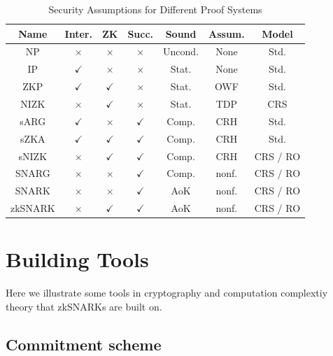 \documentclass[acmtog]{acmart}
\begin{document}
\begin{table}[tb]
	\caption{Security Assumptions for Different Proof Systems}
	\label{tab:security.assumption}
	\centering

	\begin{tabular}{ccccccc}
	\hline

	\hline
	\textbf{Name} & \textbf{Inter.} & \textbf{ZK} & \textbf{Succ.} & \textbf{Sound} & \textbf{Assum.} & \textbf{Model} \\
	\hline
		NP          & $\times$     & $\times$     & $\times$     & Uncond. & None       & Std. \\
		IP          & $\checkmark$ & $\times$     & $\times$     & Stat.   & None       & Std. \\
		ZKP         & $\checkmark$ & $\checkmark$ & $\times$     & Stat.   & OWF        & Std. \\
		NIZK        & $\times$     & $\checkmark$ & $\times$     & Stat.   & TDP        & CRS \\
		sARG        & $\checkmark$ & $\times$     & $\checkmark$ & Comp.   & CRH        & Std. \\
		sZKA        & $\checkmark$ & $\checkmark$ & $\checkmark$ & Comp.   & CRH        & Std.\\
		sNIZK       & $\times$     & $\checkmark$ & $\checkmark$ & Comp.   & CRH        & CRS / RO \\
		SNARG       & $\times$     & $\times$     & $\checkmark$ & Comp.   & nonf.      & CRS / RO  \\
		SNARK       & $\times$     & $\times$     & $\checkmark$ & AoK     & nonf.      & CRS / RO \\
		zkSNARK     & $\times$     & $\checkmark$ & $\checkmark$ & AoK     & nonf.      & CRS / RO  \\
	\hline

	\hline
	\end{tabular}
\end{table}


\section{Building Tools}
\label{sec:build.tool}

Here we illustrate some tools in cryptography and computation complextiy theory that zkSNARKs are built on.

\subsection{Commitment scheme}
\label{sec:commitment}
\end{document}

